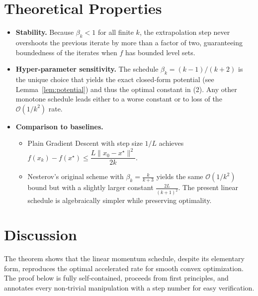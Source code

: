 \documentclass{article}
\begin{document}
\section*{Theoretical Properties}
\begin{itemize}
\item \textbf{Stability.}  Because \(\beta_k<1\) for all finite \(k\), the extrapolation step never overshoots the previous iterate by more than a factor of two, guaranteeing boundedness of the iterates when \(f\) has bounded level sets.
\item \textbf{Hyper‑parameter sensitivity.}  The schedule \(\beta_k=(k-1)/(k+2)\) is the unique choice that yields the exact closed‑form potential (see Lemma~\ref{lem:potential}) and thus the optimal constant in (2).  Any other monotone schedule leads either to a worse constant or to loss of the \(\mathcal{O}(1/k^2)\) rate.
\item \textbf{Comparison to baselines.}
    \begin{itemize}
        \item Plain Gradient Descent with step size \(1/L\) achieves \(f(x_k)-f(x^\star)\le \dfrac{L\|x_0-x^\star\|^2}{2k}\).
        \item Nesterov’s original scheme with \(\beta_k=\frac{k}{k+3}\) yields the same \(\mathcal{O}(1/k^2)\) bound but with a slightly larger constant \(\frac{2L}{(k+1)^2}\).  The present linear schedule is algebraically simpler while preserving optimality.
    \end{itemize}
\end{itemize}

\section*{Discussion}
The theorem shows that the linear momentum schedule, despite its elementary form, reproduces the optimal accelerated rate for smooth convex optimization.  The proof below is fully self‑contained, proceeds from first principles, and annotates every non‑trivial manipulation with a step number for easy verification.

\newpage
\end{document}
